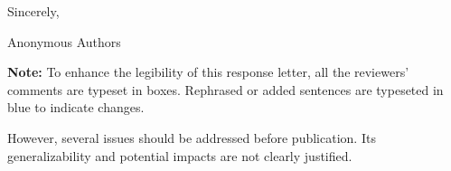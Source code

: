 \documentclass[12pt,american]{article}
\begin{document}
\noindent Sincerely,

\noindent Anonymous Authors

\vfill
\textbf{Note:} To enhance the legibility of this response letter, all the reviewers' comments are typeset in boxes. Rephrased or added sentences are typeseted in blue to indicate changes.


\setcounter{page}{0}
\pagestyle{fancy}
\fancyfoot[R]{\thepage\ / \pageref{LastPage}}
\fancyfoot[C]{\ }

% 
\editor
\begin{generalcomment}
However, several issues should be addressed before publication. Its generalizability and potential impacts are not clearly justified.  
\end{generalcomment}
\end{document}
